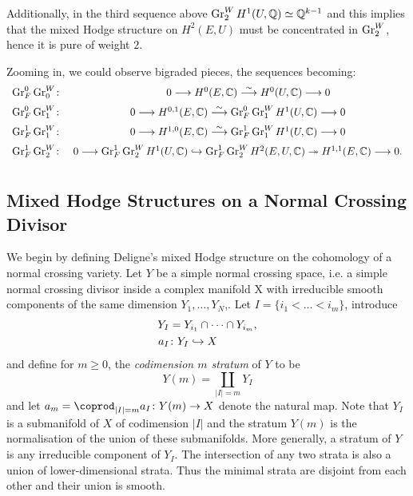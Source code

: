 \documentclass[../main.tex]{subfiles}
\begin{document}
\begin{es}
Additionally, in the third sequence above $\operatorname{Gr}^W_2H^1(U,\mathbb{Q}) \simeq \mathbb{Q}^{k-1}$ and this implies that the mixed Hodge structure on $H^2(E,U)$ must be concentrated in $\operatorname{Gr}_2^W$, hence it is pure of weight $2$.

Zooming in, we could observe bigraded pieces, the sequences becoming:
\[ \begin{array}{lcc}
\operatorname{Gr}^0_F\operatorname{Gr}^W_0\colon&\qquad 0\longrightarrow H^{0}(E,\mathbb{C})\stackrel{\sim}{\longrightarrow} H^0(U,\mathbb{C}) \longrightarrow 0 \\[2mm]
\operatorname{Gr}^0_F\operatorname{Gr}^W_1\colon& 0 \longrightarrow H^{0,1}(E,\mathbb{C}) \stackrel{\sim}{\longrightarrow} \operatorname{Gr}^0_F\operatorname{Gr}^W_1H^1(U,\mathbb{C})\longrightarrow 0 \\[2mm]
\operatorname{Gr}^1_F\operatorname{Gr}^W_1\colon& 0 \longrightarrow H^{1,0}(E,\mathbb{C}) \stackrel{\sim}{\longrightarrow} \operatorname{Gr}^1_F\operatorname{Gr}^W_1H^1(U,\mathbb{C})\longrightarrow 0 \\[2mm]
\operatorname{Gr}^1_F\operatorname{Gr}^W_2\colon& 0 \longrightarrow \operatorname{Gr}^1_F\operatorname{Gr}^W_2H^1(U,\mathbb{C}) \hookrightarrow \operatorname{Gr}^1_F\operatorname{Gr}^W_2H^{2}(E,U,\mathbb{C}) \twoheadrightarrow H^{1,1}(E,\mathbb{C})  \longrightarrow 0. \\[2mm]
\end{array}\]
\end{es}




\subsection{Mixed Hodge Structures on a Normal Crossing Divisor}\label{mhsncd}

We begin by defining Deligne's \cite{Del74} mixed Hodge structure on the cohomology of a normal crossing variety. Let $Y$ be a simple normal crossing space, i.e. a simple normal crossing divisor inside a complex manifold X with irreducible smooth components of the same dimension $Y_1,\ldots,Y_N$,. Let $I = \{ i_1< \dots <i_m\}$, introduce
\begin{align*}
    Y_I &= Y_{i_1} \cap \cdots \cap Y_{i_{m}}, \\
     a_I &\colon Y_I \hookrightarrow X 
\end{align*}
and define for $m \geq 0$, the \emph{codimension $m$ stratum} of $Y$ to be
\[Y(m) = \coprod_{|I|=m}  Y_I\]
and let $a_m= \coprod_{|I|=m} a_I \colon Y(m) \ra X$ denote the natural map. 
Note that $Y_I$ is a submanifold of $X$ of codimension $|I|$ and the stratum $Y(m)$ is the normalisation of the union of these submanifolds. More generally, a stratum of $Y$ is any irreducible component of $Y_I$.
The intersection of any two strata is also a union of lower-dimensional strata. Thus the minimal strata are disjoint from each other and their union is smooth.
\end{document}
